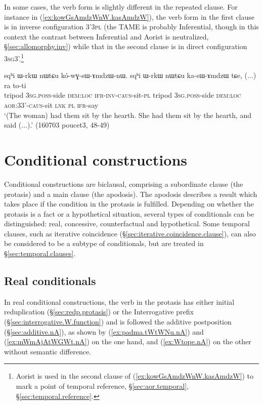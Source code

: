 In some cases, the verb form is slightly different in the repeated clause. For instance in (\ref{ex:kowGsAmdzWnW.kasAmdzW}), the verb form in the first clause is in inverse configuration 3'\fl{}\textsc{3pl} (the TAME is probably Inferential, though in this context the contrast between Inferential and Aorist is neutralized, §\ref{sec:allomorphy.inv}) while that in the second clause is in direct configuration \textsc{3sg}\fl{}3'.\footnote{Aorist is used in the second clause of (\ref{ex:kowGsAmdzWnW.kasAmdzW}) to mark a point of temporal reference, §\ref{sec:aor.temporal}, §\ref{sec:temporal.reference}.}

\begin{exe}
\ex \label{ex:kowGsAmdzWnW.kasAmdzW}
\gll sqʰi ɯ-rkɯ nɯtɕu kó-wɣ-sɯ-ɤmdzɯ-nɯ. sqʰi ɯ-rkɯ nɯtɕu ka-sɯ-ɤmdzɯ tɕe, (...) ra to-ti \\
tripod \textsc{3sg}.\textsc{poss}-side \textsc{dem}:\textsc{loc} \textsc{ifr}-\textsc{inv}-\textsc{caus}-sit-\textsc{pl} tripod \textsc{3sg}.\textsc{poss}-side \textsc{dem}:\textsc{loc} \textsc{aor}:3\fl{}3'-\textsc{caus}-sit \textsc{lnk} { } \textsc{pl} \textsc{ifr}-say \\
\glt `(The woman) had them sit by the hearth. She had them sit by the hearth, and said (...).' (160703 poucet3, 48-49)
\end{exe}

\section{Conditional constructions} \label{sec:conditionals}
Conditional constructions are biclausal, comprising a subordinate clause (the protasis) and a main clause (the apodosis). The apodosis describes a result which takes place if the condition in the protasis is fulfilled. Depending on whether the protasis is a fact or a hypothetical situation, several types of conditionals can be distinguished: real, concessive, counterfactual and hypothetical. Some temporal clauses, such as iterative coincidence (§\ref{sec:iterative.coincidence.clause}), can also be considered to be a subtype of conditionals, but are treated in §\ref{sec:temporal.clauses}.

\subsection{Real conditionals} \label{sec:real.conditional}
In real conditional constructions, the verb in the protasis has either initial reduplication (§\ref{sec:redp.protasis}) or the Interrogative  prefix (§\ref{sec:interrogative.W.function}) and is followed the additive postposition  (§\ref{sec:additive.nA}),  as shown by (\ref{ex:padma.tWtWNu.nA}) and (\ref{ex:mWmAjAtWGWt.nA}) on the one hand, and (\ref{ex:Wtope.nA}) on the other without semantic difference.

